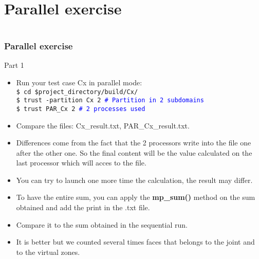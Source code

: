 \documentclass[10pt, hyperref={unicode=true,pdfusetitle, bookmarks=true,bookmarksnumbered=false,bookmarksopen=false, breaklinks=false,pdfborder={0 0 1},backref=true,colorlinks=true,linkcolor=darkblue,pageanchor, urlcolor=darkblue}]{beamer}
\begin{document}
\section{{\bf{Parallel exercise}}}
\begin{frame}
\begin{columns}[c] 
\tableofcontents[sections={1-4},currentsection, currentsubsection]
\tableofcontents[sections={5-8},currentsection, currentsubsection]
\end{columns}
\end{frame}
\begin{frame}
\frametitle{Parallel exercise}

\begin{block}{Part 1}
\begin{itemize}
\item Run your test case Cx in parallel mode:\\
    \texttt{\$ cd \$project\_directory/build/Cx/}\\
\texttt{\$ trust -partition Cx 2 \textcolor{blue}{\# Partition in 2 subdomains}}\\
\texttt{\$ trust PAR\_Cx 2 \textcolor{blue}{\# 2 processes used}}

\item Compare the files: Cx\_result.txt, PAR\_Cx\_result.txt.

\item Differences come from the fact that the 2 processors write into the file one after the other one.
So the final content will be the value calculated on the last processor which will acces to the file.

\item You can try to launch one more time the calculation, the result may differ.

\item To have the entire sum, you can apply the \textbf{mp\_sum()} method on the sum obtained and add the print in the .txt file.

\item Compare it to the sum obtained in the sequential run.

\item It is better but we counted several times faces that belongs to the joint and to the virtual zones.
\end{itemize}

\end{block}
\end{frame}
\end{document}
